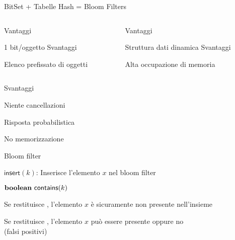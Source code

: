 \begin{frame}{BitSet + Tabelle Hash = Bloom Filters}

\vspace{-12pt}
\begin{columns}[c]
\begin{column}{0.48\textwidth}
\begin{myboxtitle}[BitSet]
\alert{Vantaggi}
\BI
\item 1 bit/oggetto
\EI
\medskip
\alert{Svantaggi}
\BI
\item Elenco prefissato di oggetti
\EI
\end{myboxtitle}

\end{column}
\hfill
\begin{column}{0.48\textwidth}
\begin{myboxtitle}
\alert{Vantaggi}
\BI
\item Struttura dati dinamica
\EI
\medskip
\alert{Svantaggi}
\BI
\item Alta occupazione di memoria
\EI
\end{myboxtitle}

\end{column}
\end{columns}

\medskip
\begin{myboxtitle}
\medskip
{}
{
\alert{Svantaggi}
\BI
\item Niente cancellazioni
\item Risposta probabilistica
\item No memorizzazione
\EI
}
\end{myboxtitle}
\end{frame}

\begin{frame}{Bloom filter}

\vspace{-6pt}
\begin{myboxtitle}[Specifica]
\BI
\item $\textsf{insert}(k)$: Inserisce l'elemento $x$ nel bloom filter
\item $\BOOLEAN\ \textsf{contains}(k)$\\
\BI
\item Se restituisce \FALSE, l'elemento $x$ è sicuramente non presente
nell'insieme
\item Se restituisce \TRUE, l'elemento $x$ può essere presente oppure no \\
(\alert{falsi positivi})
\EI
\EI
\end{myboxtitle}

\end{frame}

